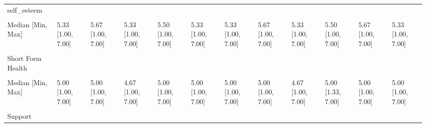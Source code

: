 \documentclass[
  single column]{article}
\begin{document}
\begin{landscape}
\begin{longtable}[t]{llllllllllll}
self\_esteem &  &  &  &  &  &  &  &  &  &  & \\
\cellcolor{gray!10}{Mean (SD)} & \cellcolor{gray!10}{5.10 (1.38)} & \cellcolor{gray!10}{5.36 (1.27)} & \cellcolor{gray!10}{5.25 (1.32)} & \cellcolor{gray!10}{5.27 (1.29)} & \cellcolor{gray!10}{5.21 (1.31)} & \cellcolor{gray!10}{5.22 (1.31)} & \cellcolor{gray!10}{5.37 (1.38)} & \cellcolor{gray!10}{4.88 (1.50)} & \cellcolor{gray!10}{5.30 (1.30)} & \cellcolor{gray!10}{5.32 (1.19)} & \cellcolor{gray!10}{5.03 (1.46)}\\
Median [Min, Max] & 5.33 [1.00, 7.00] & 5.67 [1.00, 7.00] & 5.33 [1.00, 7.00] & 5.50 [1.00, 7.00] & 5.33 [1.00, 7.00] & 5.33 [1.00, 7.00] & 5.67 [1.00, 7.00] & 5.33 [1.00, 7.00] & 5.50 [1.00, 7.00] & 5.67 [1.00, 7.00] & 5.33 [1.00, 7.00]\\
\cellcolor{gray!10}{Missing} & \cellcolor{gray!10}{113 (0.5\%)} & \cellcolor{gray!10}{4 (0.3\%)} & \cellcolor{gray!10}{1 (0.4\%)} & \cellcolor{gray!10}{15 (0.7\%)} & \cellcolor{gray!10}{19 (0.5\%)} & \cellcolor{gray!10}{2 (0.2\%)} & \cellcolor{gray!10}{1 (0.7\%)} & \cellcolor{gray!10}{0 (0\%)} & \cellcolor{gray!10}{2 (0.3\%)} & \cellcolor{gray!10}{2 (0.3\%)} & \cellcolor{gray!10}{5 (0.7\%)}\\
\addlinespace
Short Form Health &  &  &  &  &  &  &  &  &  &  & \\
\cellcolor{gray!10}{Mean (SD)} & \cellcolor{gray!10}{4.76 (1.20)} & \cellcolor{gray!10}{4.90 (1.21)} & \cellcolor{gray!10}{4.71 (1.26)} & \cellcolor{gray!10}{4.81 (1.19)} & \cellcolor{gray!10}{4.85 (1.18)} & \cellcolor{gray!10}{4.72 (1.26)} & \cellcolor{gray!10}{5.01 (1.26)} & \cellcolor{gray!10}{4.41 (1.38)} & \cellcolor{gray!10}{4.98 (1.18)} & \cellcolor{gray!10}{4.80 (1.09)} & \cellcolor{gray!10}{4.73 (1.39)}\\
Median [Min, Max] & 5.00 [1.00, 7.00] & 5.00 [1.00, 7.00] & 4.67 [1.00, 7.00] & 5.00 [1.00, 7.00] & 5.00 [1.00, 7.00] & 5.00 [1.00, 7.00] & 5.00 [1.00, 7.00] & 4.67 [1.00, 7.00] & 5.00 [1.33, 7.00] & 5.00 [1.00, 7.00] & 5.00 [1.00, 7.00]\\
\cellcolor{gray!10}{Missing} & \cellcolor{gray!10}{66 (0.3\%)} & \cellcolor{gray!10}{4 (0.3\%)} & \cellcolor{gray!10}{0 (0\%)} & \cellcolor{gray!10}{11 (0.5\%)} & \cellcolor{gray!10}{16 (0.4\%)} & \cellcolor{gray!10}{5 (0.5\%)} & \cellcolor{gray!10}{1 (0.7\%)} & \cellcolor{gray!10}{1 (1.1\%)} & \cellcolor{gray!10}{0 (0\%)} & \cellcolor{gray!10}{4 (0.7\%)} & \cellcolor{gray!10}{1 (0.1\%)}\\
Support &  &  &  &  &  &  &  &  &  &  & \\

\end{longtable}
\end{landscape}
\end{document}
